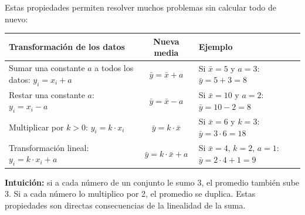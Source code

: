 \documentclass[11pt, letterpaper]{article}
\begin{document}
\begin{tcolorbox}[importantbox, title={Propiedades de transformación de la media}]
Estas propiedades permiten resolver muchos problemas sin calcular todo de nuevo:

\medskip
\begin{center}
\renewcommand{\arraystretch}{1.5}
\begin{tabular}{p{4.5cm} c p{4.5cm}}
\toprule
\textbf{Transformación de los datos} & \textbf{Nueva media} & \textbf{Ejemplo}\\
\midrule
Sumar una constante $a$ a todos los datos: \newline $y_i = x_i + a$ &
$\bar{y} = \bar{x} + a$ &
Si $\bar{x}=5$ y $a=3$: \newline $\bar{y} = 5+3=8$\\
Restar una constante $a$: \newline $y_i = x_i - a$ &
$\bar{y} = \bar{x} - a$ &
Si $\bar{x}=10$ y $a=2$: \newline $\bar{y} = 10-2=8$\\
Multiplicar por $k > 0$: \newline $y_i = k \cdot x_i$ &
$\bar{y} = k \cdot \bar{x}$ &
Si $\bar{x}=6$ y $k=3$: \newline $\bar{y} = 3 \cdot 6=18$\\
Transformación lineal: \newline $y_i = k \cdot x_i + a$ &
$\bar{y} = k \cdot \bar{x} + a$ &
Si $\bar{x}=4$, $k=2$, $a=1$: \newline $\bar{y} = 2\cdot4+1=9$\\
\bottomrule
\end{tabular}
\end{center}

\medskip

\textbf{Intuición:} si a cada número de un conjunto le sumo 3, el promedio también sube 3. Si a cada número lo multiplico por 2, el promedio se duplica. Estas propiedades son directas consecuencias de la linealidad de la suma.
\end{tcolorbox}
\end{document}
